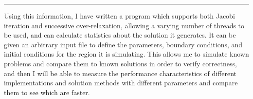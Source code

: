 \begin{center}\rule{2cm}{0.4pt}\end{center}

Using this information, I have written a program which supports both Jacobi iteration and successive over-relaxation,
allowing a varying number of threads to be used, and can calculate statistics about the solution it generates.
It can be given an arbitrary input file to define the parameters, boundary conditions, and initial conditions for
the region it is simulating. This allows me to simulate known problems and compare them to known solutions in order
to verify correctness, and then I will be able
to measure the performance characteristics of different implementations and solution methods with different parameters
and compare them to see which are faster.
